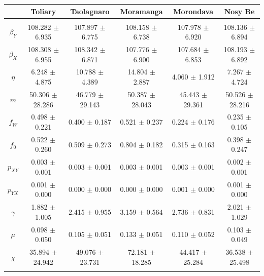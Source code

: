 \documentclass[preprint,12pt]{elsarticle}
\begin{document}
\begin{table}
\centering
\begin{tabular}{cccccc}
\rowcolor{blue!15}
 & {\bf Toliary} & {\bf Taolagnaro} & {\bf Moramanga} & {\bf Morondava} & {\bf Nosy Be} \\
\hline\hline
\rowcolor{pink}              %
\hline
\multicolumn{6}{c}{Disease transmission parameters}\\
\hline
{\bf $\beta_Y$} & 108.282 $\pm$ 6.935 & 107.897 $\pm$ 6.775 & 108.158 $\pm$ 6.738 & 107.978 $\pm$ 6.920 & 108.136 $\pm$ 6.894 \\
{\bf $\beta_X$} & 108.308 $\pm$ 6.955 & 108.342 $\pm$ 6.871 & 107.776 $\pm$ 6.900 & 107.684 $\pm$ 6.853 & 108.193 $\pm$ 6.892 \\
{\bf $\eta$} & 6.248 $\pm$ 4.875 & 10.788 $\pm$ 4.389 & 14.804 $\pm$ 2.887 & 4.060 $\pm$ 1.912 & 7.267 $\pm$ 4.724 \\
{\bf $m$} & 50.306 $\pm$ 28.286 & 46.779 $\pm$ 29.143 & 50.387 $\pm$ 28.043 & 45.443 $\pm$ 29.361 & 50.526 $\pm$ 28.216 \\
{\bf $f_W$} & 0.498 $\pm$ 0.221 & 0.400 $\pm$ 0.187 & 0.521 $\pm$ 0.237 & 0.224 $\pm$ 0.176 & 0.235 $\pm$ 0.105 \\
{\bf $f_0$} & 0.522 $\pm$ 0.260 & 0.509 $\pm$ 0.273 & 0.804 $\pm$ 0.182 & 0.315 $\pm$ 0.163 & 0.398 $\pm$ 0.247 \\
{\bf $p_{XY}$} & 0.003 $\pm$ 0.001 & 0.003 $\pm$ 0.001 & 0.003 $\pm$ 0.001 & 0.003 $\pm$ 0.001 & 0.002 $\pm$ 0.001 \\
{\bf $p_{YX}$} & 0.001 $\pm$ 0.000 & 0.000 $\pm$ 0.000 & 0.000 $\pm$ 0.000 & 0.001 $\pm$ 0.000 & 0.001 $\pm$ 0.000 \\
{\bf $\gamma$} & 1.882 $\pm$ 1.005 & 2.415 $\pm$ 0.955 & 3.159 $\pm$ 0.564 & 2.736 $\pm$ 0.831 & 2.021 $\pm$ 1.029 \\
{\bf $\mu$} & 0.098 $\pm$ 0.050 & 0.105 $\pm$ 0.051 & 0.133 $\pm$ 0.051 & 0.110 $\pm$ 0.052 & 0.103 $\pm$ 0.049 \\
{\bf $\chi$} & 35.894 $\pm$ 24.942 & 49.076 $\pm$ 23.731 & 72.181 $\pm$ 18.285 & 44.417 $\pm$ 25.284 & 36.538 $\pm$ 25.498 \\
\rowcolor{pink}              %
\hline
\multicolumn{6}{c}{Demographic parameters}\\

\end{tabular}
\end{table}
\end{document}
